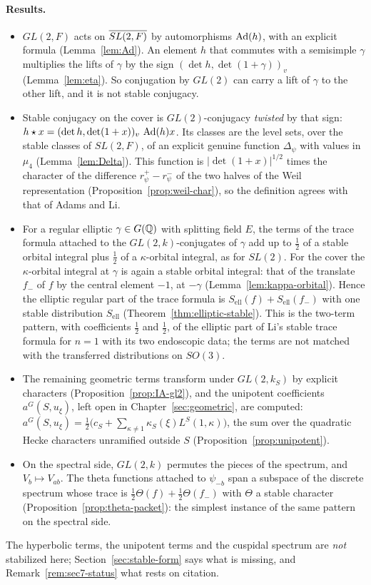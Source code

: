 \paragraph{Results.}
\begin{itemize}
\item $GL(2,F)$ acts on $\overline{SL(2,F)}$ by automorphisms $\operatorname{Ad}(h)$, with an
  explicit formula (Lemma~\ref{lem:Ad}). An element $h$ that commutes
  with a semisimple $\gamma$ multiplies the lifts of $\gamma$ by the sign
  $(\det h,\det(1+\gamma))_v$ (Lemma~\ref{lem:eta}). So conjugation by
  $GL(2)$ can carry a lift of $\gamma$ to the other lift, and it is not
  stable conjugacy.
\item Stable conjugacy on the cover is $GL(2)$-conjugacy \emph{twisted}
  by that sign: $h\star x=(\det h,\det(1+x))_v\,\operatorname{Ad}(h)x$. Its
  classes are the level sets, over the stable classes of $SL(2,F)$, of an
  explicit genuine function $\Delta_\psi$ with values in $\mu_4$
  (Lemma~\ref{lem:Delta}). This function is $|\det(1+x)|^{1/2}$ times the
  character of the difference $r^+_\psi-r^-_\psi$ of the two halves of
  the Weil representation (Proposition~\ref{prop:weil-char}), so the
  definition agrees with that of Adams and Li.
\item For a regular elliptic $\gamma\in G(\mathbb{Q})$ with splitting field $E$,
  the terms of the trace formula attached to the $GL(2,k)$-conjugates of
  $\gamma$ add up to $\frac12$ of a stable orbital integral plus $\frac12$
  of a $\kappa$-orbital integral, as for $SL(2)$. For the cover the
  $\kappa$-orbital integral at $\gamma$ is again a stable orbital
  integral: that of the translate $f_-$ of $f$ by the central element
  $-1$, at $-\gamma$ (Lemma~\ref{lem:kappa-orbital}). Hence the elliptic
  regular part of the trace formula is $S_{\mathrm{ell}}(f)+
  S_{\mathrm{ell}}(f_-)$ with one stable distribution $S_{\mathrm{ell}}$
  (Theorem~\ref{thm:elliptic-stable}). This is the two-term pattern, with
  coefficients $\frac12$ and $\frac12$, of the elliptic part of Li's
  stable trace formula for $n=1$ with its two endoscopic data; the terms
  are not matched with the transferred distributions on $SO(3)$.
\item The remaining geometric terms transform under $GL(2,k_S)$ by
  explicit characters (Proposition~\ref{prop:IA-gl2}), and the
  unipotent coefficients $a^G(S,u_\xi)$, left open in
  Chapter~\ref{sec:geometric}, are computed:
  $a^G(S,u_\xi)=\frac12\bigl(c_S+\sum_{\kappa\ne1}\kappa_S(\xi)L^S(1,\kappa)
  \bigr)$, the sum over the quadratic Hecke characters unramified outside
  $S$ (Proposition~\ref{prop:unipotent}).
\item On the spectral side, $GL(2,k)$ permutes the pieces of the
  spectrum, and $V_b\mapsto V_{ab}$. The theta functions attached to
  $\psi_{-b}$ span a subspace of the discrete spectrum whose trace is
  $\frac12\Theta(f)+\frac12\Theta(f_-)$ with $\Theta$ a stable character
  (Proposition~\ref{prop:theta-packet}): the simplest instance of the
  same pattern on the spectral side.
\end{itemize}
The hyperbolic terms, the unipotent terms and the cuspidal spectrum are
\emph{not} stabilized here; Section~\ref{sec:stable-form} says what is
missing, and Remark~\ref{rem:sec7-status} what rests on citation.

